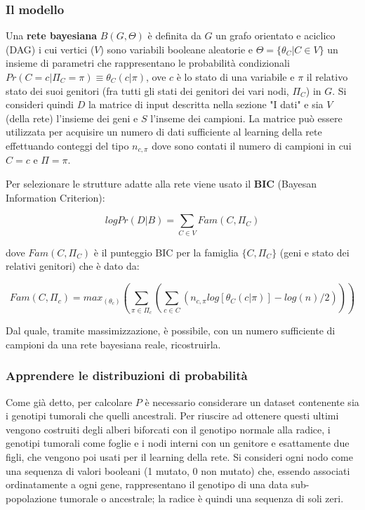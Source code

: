 \documentclass[a4paper]{article}
\begin{document}
	\subsubsection{Il modello} 

	Una \textbf{rete bayesiana} $B(G, \Theta)$ è definita da $G$ un grafo orientato e aciclico (DAG) i cui vertici ($V$) sono variabili booleane aleatorie
	e $\Theta = \{\theta_{C}|C\in V\}$ un insieme di parametri che rappresentano le probabilità condizionali $Pr(C=c|\Pi_{C}=\pi)\equiv \theta_{C}(c|\pi)$,
 	ove $c$ è lo stato di una variabile e $\pi$ il relativo stato dei suoi genitori (fra tutti gli stati dei genitori dei vari nodi, $\Pi_{C}$) in $G$. 
	Si consideri quindi $D$ la matrice di input descritta nella sezione "I dati" e sia $V$ 
	(della rete) l'insieme dei geni e $S$ l'inseme dei campioni. La matrice può essere utilizzata per acquisire
	un numero di dati sufficiente al learning della rete effettuando conteggi del tipo $n_{c,\pi}$ dove sono contati
	il numero di campioni in cui $C=c$ e $\Pi=\pi$.

	Per selezionare le strutture adatte alla rete viene usato il \textbf{BIC} (Bayesan Information Criterion):	

	$$log Pr(D|B) = \sum_{C \in V}Fam(C, \Pi_{C})$$

	dove $Fam(C, \Pi_{C})$ è il punteggio BIC per la famiglia $\{C, \Pi_{C}\}$ (geni e stato dei relativi genitori) che è dato da:

	$$Fam(C, \Pi_{c}) = max_{(\theta_{c})}(\sum_{\pi \in \Pi_{c}}(\sum_{c\in C}(n_{c,\pi}log[\theta_{C}(c|\pi)] -log(n)/2))) $$

	Dal quale, tramite massimizzazione, è possibile, con un numero sufficiente di campioni da una rete bayesiana reale, ricostruirla. 

	\subsubsection{Apprendere le distribuzioni di probabilità}

	Come già detto, per calcolare $P$ è necessario considerare un dataset contenente sia i genotipi tumorali che quelli ancestrali.
 	Per riuscire ad ottenere questi ultimi vengono costruiti degli alberi biforcati con il genotipo normale alla radice, i genotipi tumorali 
	come foglie e i nodi interni con un genitore e esattamente due figli, che vengono poi usati per il learning della rete. 
	Si consideri ogni nodo come una sequenza di valori booleani (1 mutato, 0 non mutato) che, essendo associati ordinatamente a ogni gene, rappresentano il genotipo di una data sub-popolazione tumorale o ancestrale;
	la radice è quindi una sequenza di soli zeri.
\end{document}
